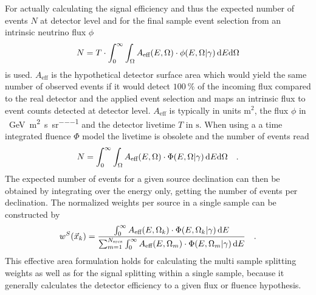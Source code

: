 For actually calculating the signal efficiency and thus the expected number of events $N$ at detector level and for the final sample event selection from an intrinsic neutrino flux $\phi$
\begin{equation}
  N = T\cdot\int_0^\infty\int_\Omega
    A_\text{eff}(E,\Omega)\cdot\phi(E,\Omega | \gamma) \,\mathrm{d}E\mathrm{d}\Omega
\end{equation}
is used.
$A_\text{eff}$ is the hypothetical detector surface area which would yield the same number of observed events if it would detect $\SI{100}{\percent}$ of the incoming flux compared to the real detector and the applied event selection and maps an intrinsic flux to event counts detected at detector level.
$A_\text{eff}$ is typically in units $\si{\m\squared}$, the flux $\phi$ in \si{\per\GeV\per\m\squared\per\second\per\steradian} and the detector livetime $T$ in $\si{\second}$.
When using a a time integrated fluence $\Phi$ model the livetime is obsolete and the number of events read
\begin{equation}
  N = \int_0^\infty\int_\Omega
    A_\text{eff}(E,\Omega)\cdot\Phi(E,\Omega | \gamma) \,\mathrm{d}E\mathrm{d}\Omega
  \quad\text{.}
\end{equation}
The expected number of events for a given source declination can then be obtained by integrating over the energy only, getting the number of events per declination.
The normalized weights per source in a single sample can be constructed by
\begin{equation}
  w^S(\vec{x}_k)
  = \frac
      {
        \int_0^\infty A_\text{eff}(E,\Omega_k) \cdot
        \Phi(E,\Omega_k | \gamma)\,\mathrm{d}E
      }
      {
        \sum_{m=1}^{N_\text{srcs}}
        \int_0^\infty A_\text{eff}(E,\Omega_m) \cdot
        \Phi(E,\Omega_m | \gamma)\,\mathrm{d}E
      }
  \quad\text{.}
\end{equation}
This effective area formulation holds for calculating the multi sample splitting weights as well as for the signal splitting within a single sample, because it generally calculates the detector efficiency to a given flux or fluence hypothesis.

